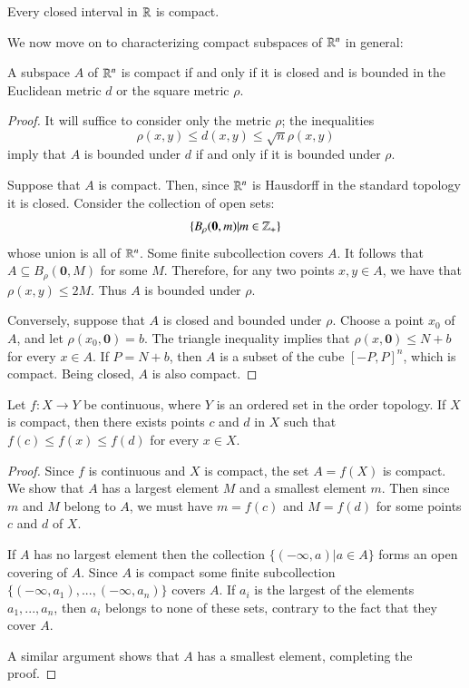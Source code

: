 \documentclass[12pt, a4paper, oneside, openright, titlepage]{book}
\begin{document}
\begin{cor}
    Every closed interval in $\mathbb R$ is compact.
\end{cor}

We now move on to characterizing compact subspaces of $\mathbb R^n$ in general:

\begin{thm}
    A subspace $A$ of $\mathbb R^n$ is compact if and only if it is closed and is bounded in the Euclidean metric $d$ or the square metric $\rho$.
\end{thm}
\begin{proof}
    It will suffice to consider only the metric $\rho$; the inequalities \begin{equation*}
        \rho(x,y) \leq d(x,y) \leq \sqrt{n}\rho(x,y)
    \end{equation*}
    imply that $A$ is bounded under $d$ if and only if it is bounded under $\rho$.

    Suppose that $A$ is compact. Then, since $\mathbb R^n$ is Hausdorff in the standard topology it is closed. Consider the collection of open sets: 
    \begin{equation*}
        \{B_{\rho}(\mathbf{0},m)\vert m \in \mathbb Z_+\}
    \end{equation*}
    whose union is all of $\mathbb R^n$. Some finite subcollection covers $A$. It follows that $A \subseteq B_{\rho}(\mathbf{0},M)$ for some $M$. Therefore, for any two points $x,y \in A$, we have that $\rho(x,y) \leq 2M$. Thus $A$ is bounded under $\rho$.

    Conversely, suppose that $A$ is closed and bounded under $\rho$. Choose a point $x_0$ of $A$, and let $\rho(x_0,\mathbf{0}) = b$. The triangle inequality implies that $\rho(x,\mathbf{0})\leq N + b$ for every $x \in A$. If $P = N + b$, then $A$ is a subset of the cube $[-P,P]^n$, which is compact. Being closed, $A$ is also compact.
\end{proof}

\begin{namthm}
     Let $f:X\rightarrow Y$ be continuous, where $Y$ is an ordered set in the order topology. If $X$ is compact, then there exists points $c$ and $d$ in $X$ such that $f(c) \leq f(x) \leq f(d)$ for every $x \in X$.
\end{namthm}
\begin{proof}
    Since $f$ is continuous and $X$ is compact, the set $A = f(X)$ is compact. We show that $A$ has a largest element $M$ and a smallest element $m$. Then since $m$ and $M$ belong to $A$, we must have $m = f(c)$ and $M = f(d)$ for some points $c$ and $d$ of $X$.

    If $A$ has no largest element then the collection $\{(-\infty,a)\vert a \in A\}$ forms an open covering of $A$. Since $A$ is compact some finite subcollection $\{(-\infty,a_1),...,(-\infty,a_n)\}$ covers $A$. If $a_i$ is the largest of the elements $a_1,...,a_n$, then $a_i$ belongs to none of these sets, contrary to the fact that they cover $A$.
    
    A similar argument shows that $A$ has a smallest element, completing the proof.
\end{proof}
\end{document}

